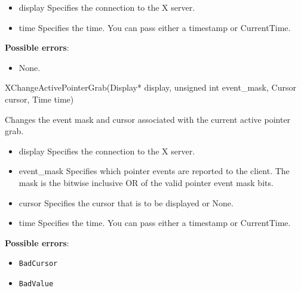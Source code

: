 \documentclass{report}
\begin{document}
\begin{itemize}
        \begin{itemize}
            \item display Specifies the connection to the X server.
            \item time Specifies the time. You can pass either a timestamp or CurrentTime.
        \end{itemize}

        \textbf{Possible errors}:
        \begin{itemize}
            \item None.
        \end{itemize}

        \begin{cppcode}
            XChangeActivePointerGrab(Display* display, unsigned int event_mask, Cursor cursor, Time time)
        \end{cppcode}
        \bigbreak \noindent
        Changes the event mask and cursor associated with the current active pointer grab.

        \begin{itemize}
            \item display Specifies the connection to the X server.
            \item event\_mask Specifies which pointer events are reported to the client. The mask is the bitwise inclusive OR of the valid pointer event mask bits.
            \item cursor Specifies the cursor that is to be displayed or None.
            \item time Specifies the time. You can pass either a timestamp or CurrentTime.
        \end{itemize}

        \textbf{Possible errors}:
        \begin{itemize}
            \item \texttt{BadCursor}
            \item \texttt{BadValue}
        \end{itemize}


\end{itemize}
\end{document}

